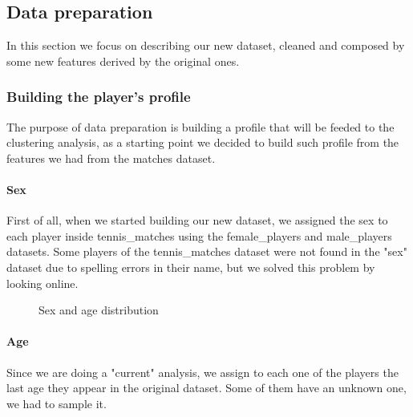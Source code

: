 \subsection{Data preparation}
In this section we focus on describing our new dataset, cleaned and composed by some new features derived by the original ones.

\subsubsection{Building the player's profile}
The purpose of data preparation is building a profile that will be feeded to the clustering analysis, as a starting point we decided to build such profile from the features we had from the matches dataset.

\paragraph{Sex}
First of all, when we started building our new dataset, we assigned the sex to each player inside tennis\_matches using the female\_players and male\_players datasets. Some players of the tennis\_matches dataset were not found in the "sex" dataset due to spelling errors in their name, but we solved this problem by looking online.
\begin{figure}[H]
    \centering
    \caption{Sex and age distribution}
    \label{fig:sex_age_feature}
\end{figure}
\paragraph{Age}
Since we are doing a "current" analysis, we assign to each one of the players the last age they appear in the original dataset. Some of them have an unknown one, we had to sample it.


